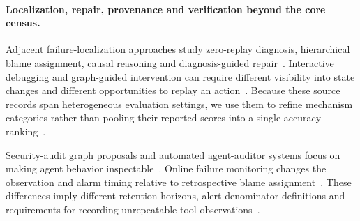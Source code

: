 \paragraph{Localization, repair, provenance and verification beyond the core census.}
Adjacent failure-localization approaches study zero-replay diagnosis, hierarchical blame assignment, causal reasoning and diagnosis-guided repair~\cite{ext001,ext002,ext004}.
Interactive debugging and graph-guided intervention can require different visibility into state changes and different opportunities to replay an action~\cite{ext005,ext007}.
Because these source records span heterogeneous evaluation settings, we use them to refine mechanism categories rather than pooling their reported scores into a single accuracy ranking~\cite{ext037,ext114}.

Security-audit graph proposals and automated agent-auditor systems focus on making agent behavior inspectable~\cite{ext015,ext016}.
Online failure monitoring changes the observation and alarm timing relative to retrospective blame assignment~\cite{ext021}.
These differences imply different retention horizons, alert-denominator definitions and requirements for recording unrepeatable tool observations~\cite{ext053}.

